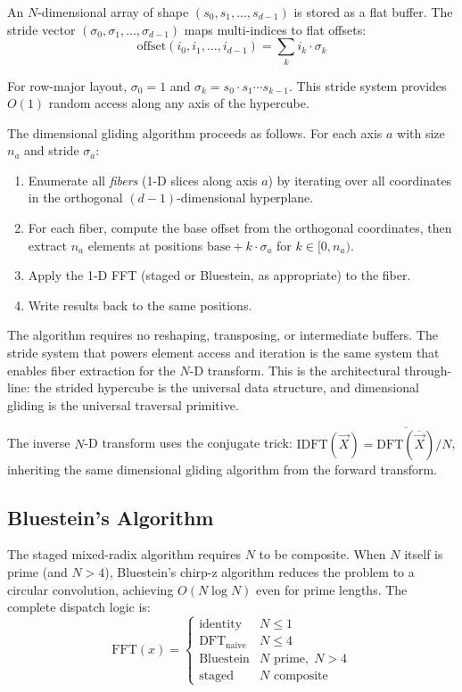 \documentclass[12pt,a4paper]{report}
\theoremstyle{thms}
\theoremstyle{defns}
\begin{document}
An $N$-dimensional array of shape $(s_0, s_1, \ldots, s_{d-1})$ is stored as a flat buffer. The stride vector $(\sigma_0, \sigma_1, \ldots, \sigma_{d-1})$ maps multi-indices to flat offsets:
\begin{equation}
    \mathrm{offset}(i_0, i_1, \ldots, i_{d-1}) = \sum_k i_k \cdot \sigma_k
\end{equation}

For row-major layout, $\sigma_0 = 1$ and $\sigma_k = s_0 \cdot s_1 \cdots s_{k-1}$. This stride system provides $O(1)$ random access along any axis of the hypercube.

The dimensional gliding algorithm proceeds as follows. For each axis $a$ with size $n_a$ and stride $\sigma_a$:
\begin{enumerate}
    \item Enumerate all \textit{fibers} (1-D slices along axis $a$) by iterating over all coordinates in the orthogonal $(d-1)$-dimensional hyperplane.
    \item For each fiber, compute the base offset from the orthogonal coordinates, then extract $n_a$ elements at positions $\mathrm{base} + k \cdot \sigma_a$ for $k \in [0, n_a)$.
    \item Apply the 1-D FFT (staged or Bluestein, as appropriate) to the fiber.
    \item Write results back to the same positions.
\end{enumerate}

The algorithm requires no reshaping, transposing, or intermediate buffers. The stride system that powers element access and iteration is the same system that enables fiber extraction for the $N$-D transform. This is the architectural through-line: the strided hypercube is the universal data structure, and dimensional gliding is the universal traversal primitive.

The inverse $N$-D transform uses the conjugate trick: $\mathrm{IDFT}(\vec{X}) = \overline{\mathrm{DFT}(\overline{\vec{X}})} / N$, inheriting the same dimensional gliding algorithm from the forward transform.

\subsection{Bluestein's Algorithm}
\label{sec:bluestein_dispatch}

The staged mixed-radix algorithm requires $N$ to be composite. When $N$ itself is prime (and $N > 4$), Bluestein's chirp-z algorithm \cite{bluestein_chirp} reduces the problem to a circular convolution, achieving $O(N \log N)$ even for prime lengths. The complete dispatch logic is:
\begin{equation}
    \mathrm{FFT}(x) = \begin{cases}
        \mathrm{identity}             & N \leq 1 \\
        \mathrm{DFT}_{\mathrm{naive}} & N \leq 4 \\
        \mathrm{Bluestein}            & N \text{ prime},\; N > 4 \\
        \mathrm{staged}               & N \text{ composite}
    \end{cases}
\end{equation}
\end{document}
